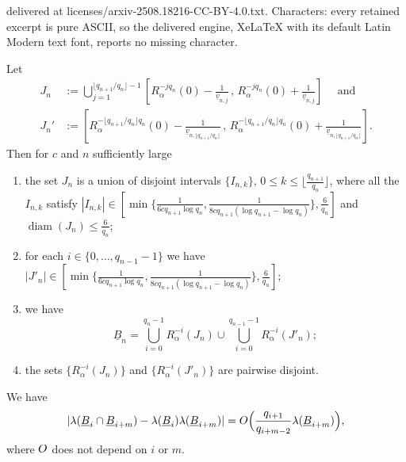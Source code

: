 \documentclass[10pt,a4paper]{amsart}
\DeclareMathOperator{\diam}{diam}
\begin{document}
delivered at licenses/arxiv-2508.18216-CC-BY-4.0.txt. Characters: every retained excerpt is pure ASCII, so the delivered engine, XeLaTeX with its default Latin Modern text font, reports no missing character.
\begin{lemma}\label{lem:add} 
Let 
\begin{align*}
 J_n&:= \bigcup_{j=1}^{\lfloor q_{n+1}/q_n\rfloor-1} \left[ R_{\alpha}^{-jq_n}(0)-\frac{1}{\underline{v}_{n,j}}\, ,\, R_{\alpha}^{-jq_n}(0) + \frac{1}{\underline{v}_{n,j}}\right]\quad\text{ and }\\
 J_n'&:=\left[ R_{\alpha}^{-\lfloor q_{n+1}/q_n\rfloor q_n}(0)-\frac{1}{\underline{v}_{n,\lfloor q_{n+1}/q_n\rfloor}}\, ,\, R_{\alpha}^{-\lfloor q_{n+1}/q_n\rfloor q_n}(0) + \frac{1}{\underline{v}_{n,\lfloor q_{n+1}/q_n\rfloor}}\right].
\end{align*}
Then for $c$ and $n$ sufficiently large
\begin{enumerate}[label=\textbf{(B.\arabic*)}]
\item\label{B1} the set $J_{n}$ is a union of disjoint intervals $\{I_{n,k}\}$, $0 \leq k\leq \lfloor \frac{q_{n+1}}{q_n}\rfloor$, where all the $I_{n,k}$
satisfy $|I_{n,k}|\in [\min\{ \frac{1}{6cq_{n+1}\log q_n}, \frac{1}{8c q_{n+1}(\log q_{n+1}-\log q_n)}\}, \frac{6}{q_n}]$ and $\diam(J_{n})\leq \frac{6}{q_n}$;
\item\label{B2} for each $i\in \{0,\ldots, q_{n-1}-1\}$ we have $|J'_{n}|\in  [\min\{ \frac{1}{6cq_{n+1}\log q_n}, \frac{1}{8c q_{n+1}(\log q_{n+1}-\log q_n)}\}, \frac{6}{q_n}]$; 
\item\label{B3} 
we have  $$\underline{B}_n=\bigcup_{i=0}^{q_n-1} R^{-i}_\alpha(J_n)\cup \bigcup_{i=0}^{q_{n-1}-1} R^{-i}_\alpha(J'_n);$$

\item\label{B4} the sets $\{R^{-i}_\alpha(J_n)\}$ and $\{R^{-i}_\alpha(J'_n)\}$ are pairwise disjoint.
\end{enumerate}
\end{lemma}

\begin{lemma}\label{lem:add2} We have 
$$
|\lambda(\underline{B}_i\cap \underline{B}_{i+m})- \lambda(\underline{B}_i)\lambda(\underline{B}_{i+m})|={\rm O}\Big(\frac{q_{i+1}}{q_{i+m-2}}\lambda(\underline{B}_{i+m})\Big),
$$
where $\rm O$ does not depend on $i$ or $m$.
\end{lemma}
\end{document}
